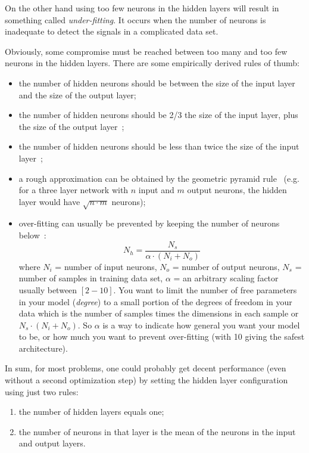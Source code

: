On the other hand using too few neurons in the hidden layers will result in something called \emph{under-fitting}. It occurs when the number of neurons is inadequate to detect the signals in a complicated data set.

Obviously, some compromise must be reached between too many and too few neurons in the hidden layers. There are some empirically derived rules of thumb:
\begin{itemize}
\item the number of hidden neurons should be between the size of the input layer and the size of the output layer;
\item the number of hidden neurons should be 2/3 the size of the input layer, plus the size of the output layer~\cite{bib:heaton};
\item the number of hidden neurons should be less than twice the size of the input layer~\cite{bib:heaton};
\item a rough approximation can be obtained by the geometric pyramid rule~\cite{bib:master} (e.g. for a three layer network with $n$ input and $m$ output neurons, the hidden layer would have $\sqrt{n\cdot m}$ neurons);
\item over-fitting can usually be prevented by keeping the number of neurons below~\cite{bib:hagan}:
\begin{equation*}
	N_h = \frac{N_s}{\alpha\cdot(N_i+N_o)}
\end{equation*}
where $N_i$ = number of input neurons, $N_o$ = number of output neurons, $N_s$ = number of samples in training data set, $\alpha$ = an arbitrary scaling factor usually between $[2-10]$. 
You want to limit the number of free parameters in your model (\emph{degree}) to a small portion of the degrees of freedom in your data which is the number of samples times the  dimensions in each sample or $N_s\cdot(N_i+N_o)$. So $\alpha$ is a way to indicate how general you want your model to be, or how much you want to prevent over-fitting (with 10 giving the safest architecture).
\end{itemize}

In sum, for most problems, one could probably get decent performance (even without a second optimization step) by setting the hidden layer configuration using just two rules:
\begin{enumerate}
\item the number of hidden layers equals one; 
\item the number of neurons in that layer is the mean of the neurons in the input and output layers.
\end{enumerate}


